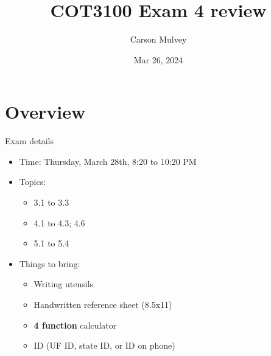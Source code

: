 \documentclass[dvipsnames,t,aspectratio=169]{beamer}
\author{Carson Mulvey}
\title{COT3100 Exam 4 review}
\date{Mar 26, 2024}
\begin{document}
\frame{\titlepage}


\section{Overview}

\begin{frame}{Exam details}
\begin{itemize}
	\item Time: Thursday, March 28th, 8:20 to 10:20 PM
	\item Topics:
	\begin{itemize}
		\item 3.1 to 3.3
		\item 4.1 to 4.3; 4.6
            \item 5.1 to 5.4
	\end{itemize}
	\item Things to bring:
	\begin{itemize}
		\item Writing utensils
		\item Handwritten reference sheet (8.5x11)
		\item \textbf{4 function} calculator
		\item ID (UF ID, state ID, or ID on phone)
	\end{itemize}
\end{itemize}
\end{frame}
\end{document}
